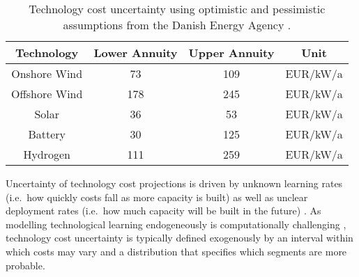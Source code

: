 \begin{SCtable}
    \begin{small}
        \begin{tabular}{cccc}
            \toprule
            Technology & Lower Annuity & Upper Annuity & Unit  \\ \midrule
            Onshore Wind & 73 & 109 & EUR/kW/a \\
            Offshore Wind & 178 & 245 & EUR/kW/a \\ %
            Solar & 36 & 53 & EUR/kW/a \\
            Battery & 30 & 125 & EUR/kW/a \\
            Hydrogen & 111 & 259 & EUR/kW/a \\ \bottomrule
        \end{tabular}
    \end{small}
    \caption[Technology Cost Uncertainty]{Technology cost uncertainty using optimistic and pessimistic assumptions from the Danish Energy Agency \cite{DEA}.}
    \label{tab:costuncertainty}
\end{SCtable}   


Uncertainty of technology cost projections is driven 
by unknown learning rates (i.e.~how quickly costs fall as more capacity is built)
as well as unclear deployment rates (i.e.~how much capacity will be built in the future) \cite{gritsevskyi_modeling_2000,yeh_review_2012}.
As modelling technological learning endogeneously is computationally challenging \cite{heuberger_power_2017,mattsson_learning_2019},
technology cost uncertainty is typically defined exogenously by an interval within which costs may vary
and a distribution that specifies which segments are more probable.


